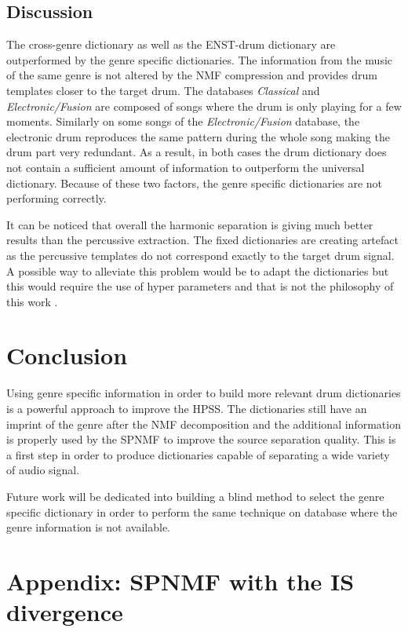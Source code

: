 \documentclass{article}
\begin{document}
\subsection{Discussion}

The cross-genre dictionary as well as the ENST-drum dictionary are outperformed by the genre specific dictionaries. The information from the music of the same genre is not altered by the NMF compression and provides drum templates closer to the target drum.  
The databases \emph{Classical} and \emph{Electronic/Fusion} are composed of songs where the drum is only playing for a few moments. Similarly on some songs of the \emph{Electronic/Fusion} database, the electronic drum reproduces the same pattern during the whole song making the drum part very redundant. As a result, in both cases the drum dictionary does not contain a sufficient amount of information to outperform the universal dictionary. Because of these two factors, the genre specific dictionaries are not performing correctly.

It can be noticed that overall the harmonic separation is giving much better results than the percussive extraction. The fixed dictionaries are creating artefact as the percussive templates do not correspond exactly to the target drum signal. A possible way to alleviate this problem would be to adapt the dictionaries but this would require the use of hyper parameters and that is not the philosophy of this work \cite{laroche2015structured}.

\vspace{-1cm}
\section{Conclusion}\label{sec:conclusion}

Using genre specific information in order to build more relevant drum dictionaries is a powerful approach to improve the HPSS. The dictionaries still have an imprint of the genre after the NMF decomposition and the additional information is properly used by the SPNMF to improve the source separation quality. This is a first step in order to produce dictionaries capable of separating a wide variety of audio signal. 

Future work will be dedicated into building a blind method to select the genre specific dictionary in order to perform the same technique on database where the genre information is not available. 


\section{Appendix: SPNMF with the IS divergence}\label{ISdisteq}
 
\end{document}
